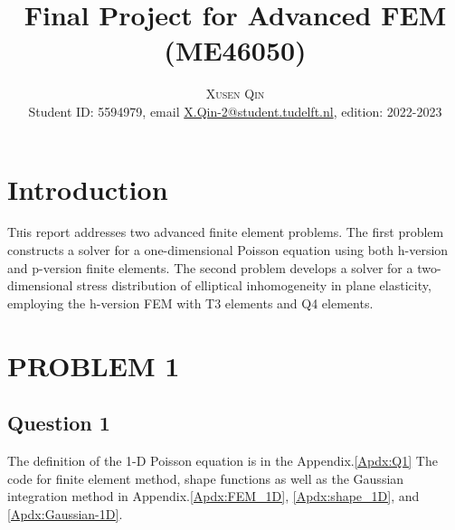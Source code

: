 \documentclass[twoside,twocolumn,10pt]{article}
\title{Final Project for Advanced FEM (ME46050)} %
\author{%
\textsc{Xusen Qin} \\[1ex] %
\normalsize Student ID: 5594979, email \href{X.Qin-2@student.tudelft.nl}{X.Qin-2@student.tudelft.nl}, %
edition: 2022-2023
}
\date{} %
\begin{document}
\maketitle


\section{Introduction}

\lettrine[nindent=0em,lines=3]{T}his report addresses two advanced finite element problems. The first problem constructs a solver for a one-dimensional Poisson equation using both h-version and p-version finite elements. The second problem develops a solver for a two-dimensional stress distribution of elliptical inhomogeneity in plane elasticity, employing the h-version FEM with T3 elements and Q4 elements.


\section{\textbf{PROBLEM 1}}
\subsection{Question 1}
The definition of the 1-D Poisson equation is in the Appendix.\ref{Apdx:Q1}
The code for finite element method, shape functions as well as the Gaussian integration method in Appendix.\ref{Apdx:FEM_1D}, \ref{Apdx:shape_1D}, and \ref{Apdx:Gaussian-1D}.
\end{document}
